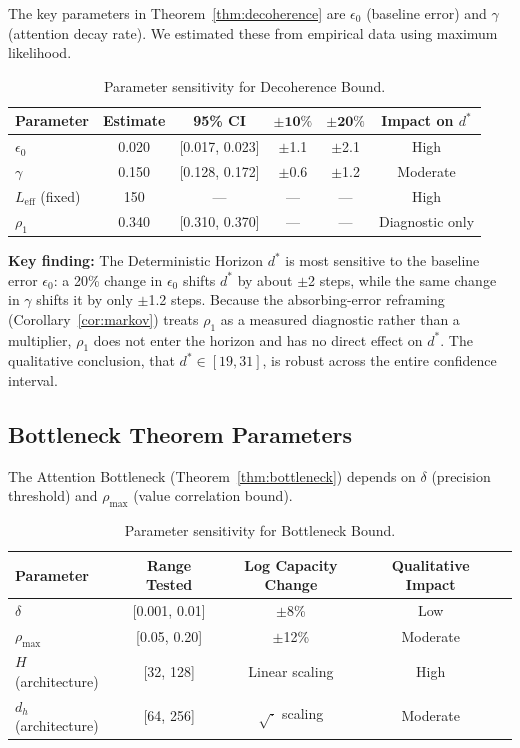 \documentclass{article}
\theoremstyle{plain}
\theoremstyle{definition}
\theoremstyle{remark}
\newcommand{\Leff}{L_{\mathrm{eff}}}
\begin{document}
The key parameters in Theorem~\ref{thm:decoherence} are $\epsilon_0$ (baseline error) and $\gamma$ (attention decay rate). We estimated these from empirical data using maximum likelihood.

\begin{table}[h]
\centering
\caption{Parameter sensitivity for Decoherence Bound.}
\label{tab:sensitivity_decoherence}
\small
\begin{tabular}{@{}lccccc@{}}
\toprule
\textbf{Parameter} & \textbf{Estimate} & \textbf{95\% CI} & $\boldsymbol{\pm 10\%}$ & $\boldsymbol{\pm 20\%}$ & \textbf{Impact on $d^*$} \\
\midrule
$\epsilon_0$ & 0.020 & [0.017, 0.023] & $\pm$1.1 & $\pm$2.1 & High \\
$\gamma$ & 0.150 & [0.128, 0.172] & $\pm$0.6 & $\pm$1.2 & Moderate \\
$\Leff$ (fixed) & 150 & --- & --- & --- & High \\
$\rho_1$ & 0.340 & [0.310, 0.370] & --- & --- & Diagnostic only \\
\bottomrule
\end{tabular}
\end{table}

\textbf{Key finding:} The Deterministic Horizon $d^*$ is most sensitive to the baseline error $\epsilon_0$: a 20\% change in $\epsilon_0$ shifts $d^*$ by about $\pm$2 steps, while the same change in $\gamma$ shifts it by only $\pm$1.2 steps. Because the absorbing-error reframing (Corollary~\ref{cor:markov}) treats $\rho_1$ as a measured diagnostic rather than a multiplier, $\rho_1$ does not enter the horizon and has no direct effect on $d^*$. The qualitative conclusion, that $d^* \in [19, 31]$, is robust across the entire confidence interval.

\subsection{Bottleneck Theorem Parameters}

The Attention Bottleneck (Theorem~\ref{thm:bottleneck}) depends on $\delta$ (precision threshold) and $\rho_{\max}$ (value correlation bound).

\begin{table}[h]
\centering
\caption{Parameter sensitivity for Bottleneck Bound.}
\label{tab:sensitivity_bottleneck}
\small
\begin{tabular}{@{}lcccc@{}}
\toprule
\textbf{Parameter} & \textbf{Range Tested} & \textbf{Log Capacity Change} & \textbf{Qualitative Impact} \\
\midrule
$\delta$ & [0.001, 0.01] & $\pm$8\% & Low \\
$\rho_{\max}$ & [0.05, 0.20] & $\pm$12\% & Moderate \\
$H$ (architecture) & [32, 128] & Linear scaling & High \\
$d_h$ (architecture) & [64, 256] & $\sqrt{\cdot}$ scaling & Moderate \\
\bottomrule
\end{tabular}
\end{table}
\end{document}
